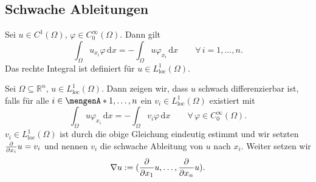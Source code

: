 \subsection{Schwache Ableitungen} 
\label{sub:schwache_ableitungen}
 Sei $u \in C^1(\Omega)$, $\varphi \in C^{\infty}_0(\Omega)$. Dann gilt
\[
	\int_{\Omega}^{}u_{x_i}\varphi \,\mathrm{d}x = - \int_{\Omega}^{}u \varphi_{x_i} \,\mathrm{d}x \qquad \forall\,  i=1,\dots,n.
\]
Das rechte Integral ist definiert für $u \in L^1_{\text{loc}}(\Omega)$.
\begin{definition*}
	Sei $\Omega \subseteq \mathbb{R}^n$, $u \in L^1_{\text{loc}}(\Omega)$. Dann zeigen wir, dass $u$ schwach differenzierbar ist, falls für alle $i \in \set{1,\dots,n}$ ein $v_i \in L^1_{\text{loc}}(\Omega)$ existiert mit
	\[
		\int_{\Omega}^{}u \varphi_{x_i} \,\mathrm{d}x = - \int_{\Omega}^{}v_i \varphi \,\mathrm{d}x \qquad \forall\, \varphi \in C^{\infty}_0(\Omega).
	\]
	$v_i \in L^1_{\text{loc}}(\Omega)$ ist durch die obige Gleichung eindeutig estimmt und wir setzten $\frac{{\partial }}{{\partial x_i}} u = v_i$ und nennen $v_i$ die schwache Ableitung von $u$ nach $x_i$. Weiter setzen wir
	\[
		 \nabla u := ( \frac{{\partial }}{{\partial x_1}} u, \dots , \frac{{\partial }}{{\partial x_n}}  u).
	\]
\end{definition*}

